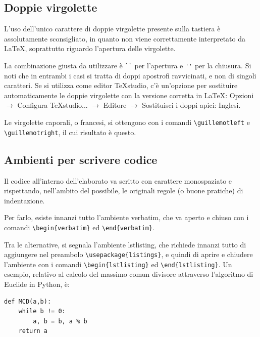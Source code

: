 \documentclass[12pt]{report}
\begin{document}
\subsection{Doppie virgolette}

L'uso dell'unico carattere di doppie virgolette presente sulla tastiera è assolutamente sconsigliato, in quanto non viene correttamente interpretato da \LaTeX, soprattutto riguardo l'apertura delle virgolette.

La combinazione giusta da utilizzare è \verb|``| per l'apertura e \verb|''| per la chiusura. Si noti che in entrambi i casi si tratta di doppi apostrofi ravvicinati, e non di singoli caratteri. Se si utilizza come editor TeXstudio, c'è un'opzione per sostituire automaticamente le doppie virgolette con la versione corretta in \LaTeX: Opzioni $\rightarrow$ Configura TeXstudio... $\rightarrow$ Editore $\rightarrow$ Sostituisci i doppi apici: Inglesi.

Le virgolette caporali, o francesi, si ottengono con i comandi \verb|\guillemotleft| e \break\verb|\guillemotright|, il cui risultato è \guillemotleft questo\guillemotright.


\subsection{Ambienti per scrivere codice}

Il codice all'interno dell'elaborato va scritto con carattere monospaziato e rispettando, nell'ambito del possibile, le originali regole (o buone pratiche) di indentazione.

Per farlo, esiste innanzi tutto l'ambiente verbatim, che va aperto e chiuso con i comandi \verb|\begin{verbatim}| ed \verb|\end{verbatim}|.

Tra le alternative, si segnala l'ambiente lstlisting, che richiede innanzi tutto di aggiungere nel preambolo \verb|\usepackage{listings}|, e quindi di aprire e chiudere l'ambiente con i comandi \verb|\begin{lstlisting}| ed \verb|\end{lstlisting}|. Un esempio, relativo al calcolo del massimo comun divisore attraverso l'algoritmo di Euclide in Python, è:

\begin{lstlisting}
def MCD(a,b):
	while b != 0:
		a, b = b, a % b
	return a
\end{lstlisting}
\end{document}
